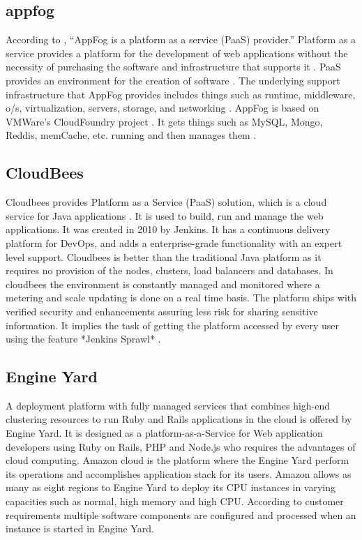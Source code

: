     
\subsection{appfog}

    According to \cite{wee}, ``AppFog is a platform as a service (PaaS)
    provider.'' Platform as a service provides a platform for the
    development of web applications without the necessity of
    purchasing the software and infrastructure that supports
    it \cite{kepes}. PaaS provides an environment for the creation of
    software \cite{kepes}. The underlying support infrastructure that AppFog
    provides includes things such as runtime, middleware, o/s,
    virtualization, servers, storage, and networking \cite{appfog}. AppFog
    is based on VMWare’s CloudFoundry project \cite{wee}. It gets things
    such as MySQL, Mongo, Reddis, memCache, etc. running and then
    manages them \cite{tweney}.
    
\subsection{CloudBees}

    Cloudbees provides Platform as a Service (PaaS) solution, which is
    a cloud service for Java applications
    \cite{www-cloudbees-wiki}. It is used to build, run and manage
    the web applications. It was created in 2010 by Jenkins. It has a
    continuous delivery platform for DevOps, and adds a
    enterprise-grade functionality with an expert level
    support. Cloudbees is better than the traditional Java platform as
    it requires no provision of the nodes, clusters, load balancers
    and databases. In cloudbees the environment is constantly managed
    and monitored where a metering and scale updating is done on a
    real time basis. The platform ships with verified security and
    enhancements assuring less risk for sharing sensitive
    information. It implies the task of getting the platform accessed
    by every user using the feature *Jenkins Sprawl*
    \cite{www-cloudbees-webpage}.

\subsection{Engine Yard \cite{www-engineyard}}

    A deployment platform with fully managed services that combines
    high-end clustering resources to run Ruby and Rails applications
    in the cloud is offered by Engine Yard. It is designed as a
    platform-as-a-Service for Web application developers using Ruby on
    Rails, PHP and Node.js who requires the advantages of cloud
    computing. Amazon cloud is the platform where the Engine Yard
    perform its operations and accomplishes application stack for its
    users. Amazon allows as many as eight regions to Engine Yard to
    deploy its CPU instances in varying capacities such as normal,
    high memory and high CPU. According to customer requirements
    multiple software components are configured and processed when an
    instance is started in Engine Yard.
    

